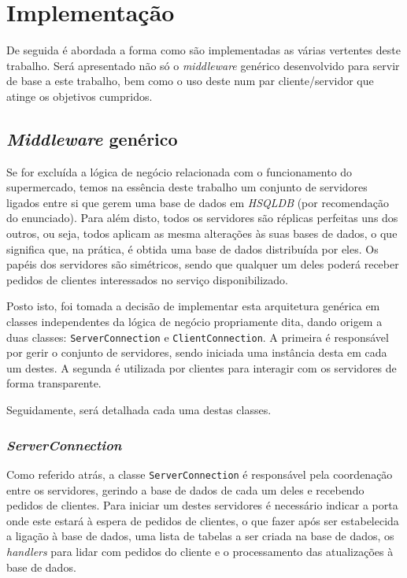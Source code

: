 \documentclass[a4paper]{report}
\begin{document}
\chapter{Implementação} \label{ch:Implementation}
\large{
	De seguida é abordada a forma como são implementadas as várias vertentes deste trabalho. Será apresentado não só o \textit{middleware} genérico desenvolvido para servir de base a este trabalho, bem como o uso deste num par cliente/servidor que atinge os objetivos cumpridos.

	\section{\textit{Middleware} genérico} \label{sec:Middleware}
		Se for excluída a lógica de negócio relacionada com o funcionamento do supermercado, temos na essência deste trabalho um conjunto de servidores ligados entre si que gerem uma base de dados em \textit{HSQLDB} (por recomendação do enunciado). Para além disto, todos os servidores são réplicas perfeitas uns dos outros, ou seja, todos aplicam as mesma alterações às suas bases de dados, o que significa que, na prática, é obtida uma base de dados distribuída por eles. Os papéis dos servidores são simétricos, sendo que qualquer um deles poderá receber pedidos de clientes interessados no serviço disponibilizado.

		Posto isto, foi tomada a decisão de implementar esta arquitetura genérica em classes independentes da lógica de negócio propriamente dita, dando origem a duas classes: \texttt{ServerConnection} e \texttt{ClientConnection}. A primeira é responsável por gerir o conjunto de servidores, sendo iniciada uma instância desta em cada um destes. A segunda é utilizada por clientes para interagir com os servidores de forma transparente.

		Seguidamente, será detalhada cada uma destas classes.

		\subsection{\textit{ServerConnection}} \label{subsec:ServerConnection}
			Como referido atrás, a classe \texttt{ServerConnection} é responsável pela coordenação entre os servidores, gerindo a base de dados de cada um deles e recebendo pedidos de clientes. Para iniciar um destes servidores é necessário indicar a porta onde este estará à espera de pedidos de clientes, o que fazer após ser estabelecida a ligação à base de dados, uma lista de tabelas a ser criada na base de dados, os \textit{handlers} para lidar com pedidos do cliente e o processamento das atualizações à base de dados.
			
}
\end{document}
